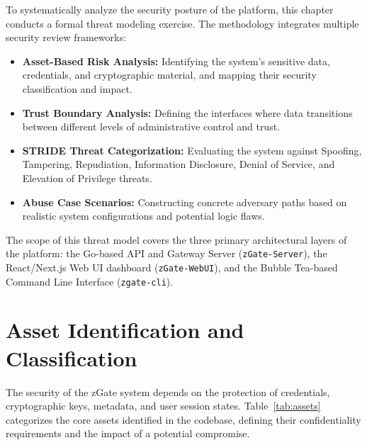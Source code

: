 To systematically analyze the security posture of the platform, this chapter conducts a formal threat modeling exercise. The methodology integrates multiple security review frameworks:
\begin{itemize}[leftmargin=*]
    \item \textbf{Asset-Based Risk Analysis:} Identifying the system's sensitive data, credentials, and cryptographic material, and mapping their security classification and impact.
    \item \textbf{Trust Boundary Analysis:} Defining the interfaces where data transitions between different levels of administrative control and trust.
    \item \textbf{STRIDE Threat Categorization:} Evaluating the system against Spoofing, Tampering, Repudiation, Information Disclosure, Denial of Service, and Elevation of Privilege threats.
    \item \textbf{Abuse Case Scenarios:} Constructing concrete adversary paths based on realistic system configurations and potential logic flaws.
\end{itemize}

The scope of this threat model covers the three primary architectural layers of the platform: the Go-based API and Gateway Server (\texttt{zGate-Server}), the React/Next.js Web UI dashboard (\texttt{zGate-WebUI}), and the Bubble Tea-based Command Line Interface (\texttt{zgate-cli}).

\section{Asset Identification and Classification}

The security of the zGate system depends on the protection of credentials, cryptographic keys, metadata, and user session states. Table~\ref{tab:assets} categorizes the core assets identified in the codebase, defining their confidentiality requirements and the impact of a potential compromise.

